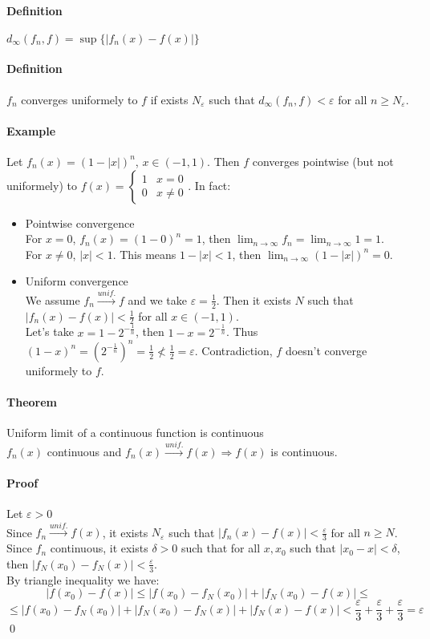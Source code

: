 \documentclass{article}
\newcommand{\DS}{\displaystyle}
\newcommand{\abs}[1]{\left|#1\right|}
\newcommand{\limn}{\lim_{n \to \infty}}
\newcommand{\tounif}{\xrightarrow{unif.}}
\newcommand{\intoo}[1]{\left(#1\right)}
\newcommand{\Ep}{\varepsilon}
\newcommand{\Def}{\paragraph{Definition}}
\newcommand{\Theorem}{\paragraph{Theorem}}
\newcommand{\Proof}{\paragraph{Proof}}
\newcommand{\Example}{\paragraph{Example}}
\begin{document}
  \Def $d_\infty(f_n,f) = \sup \{ \abs{f_n(x) - f(x)} \}$

  \Def $f_n$ converges uniformely to $f$ if exists $N_\Ep$ such that
  $d_\infty(f_n,f) < \Ep$ for all $n \geq N_\Ep$.

  \Example Let $f_n(x) = (1 - \abs{x})^n$, $x \in \intoo{-1,1}$. Then $f$
  converges pointwise (but not uniformely) to $f(x) =
  \begin{cases}1 & x = 0 \\ 0 & x \neq 0\end{cases}$. In fact:
\begin{itemize}
  \item Pointwise convergence
\\For $x = 0$, $f_n(x) = (1 - 0)^n = 1$, then $\DS \limn{f_n} = \limn{1} = 1$.
\\For $x \neq 0$, $\abs{x} < 1$. This means $1 - |x| < 1$, then
  $\DS \limn{(1-|x|)^n} = 0$.

  \item Uniform convergence
\\We assume $f_n \tounif f$ and we take $\Ep = \frac{1}{2}$. Then it exists $N$
  such that $\abs{f_n(x) - f(x)} < \frac{1}{2}$ for all $x \in \intoo{-1,1}$.
\\Let's take $x = 1 - 2^{-\frac{1}{n}}$, then $1 - x = 2^{-\frac{1}{n}}$. Thus
  $(1 - x)^n = (2^{-\frac{1}{n}})^n = \frac{1}{2} \nless \frac{1}{2} = \Ep$.
  Contradiction, $f$ doesn't converge uniformely to $f$.
\end{itemize}

  \Theorem Uniform limit of a continuous function is continuous
\\$f_n(x)$ continuous and $f_n(x) \tounif f(x) \Rightarrow f(x)$ is continuous.

  \Proof Let $\Ep > 0$
\\Since $f_n \tounif f(x)$, it exists $N_\Ep$ such that $\abs{f_n(x)-f(x)} <
  \frac{\Ep}{3}$ for all $n \geq N$.
\\Since $f_n$ continuous, it exists $\delta > 0$ such that for all $x,x_0$ such
  that $\abs{x_0 - x} < \delta$, then $\abs{f_N(x_0) - f_N(x)} < \frac{\Ep}{3}$.
\\By triangle inequality we have:
\begin{equation*}
  \abs{f(x_0) - f(x)} \leq \abs{f(x_0) - f_N(x_0)} + \abs{f_N(x_0) - f(x)} \leq
\end{equation*}
\begin{equation*} \leq
  \abs{f(x_0) - f_N(x_0)} + \abs{f_N(x_0) - f_N(x)} + \abs{f_N(x) - f(x)} <
  \frac{\Ep}{3} + \frac{\Ep}{3} + \frac{\Ep}{3} = \Ep
\end{equation*}
  \qed
\end{document}
